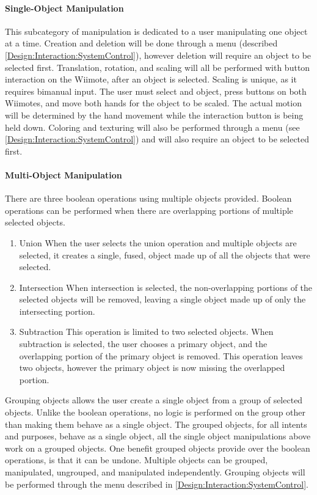 \paragraph{Single-Object Manipulation}
This subcategory of manipulation is dedicated to a user manipulating one object at a time.
Creation and deletion will be done through a menu (described \ref{Design:Interaction:SystemControl}), however deletion will require an object to be selected first.
Translation, rotation, and scaling will all be performed with button interaction on the Wiimote, after an object is selected.
Scaling is unique, as it requires bimanual input.
The user must select and object, press buttons on both Wiimotes, and move both hands for the object to be scaled.
The actual motion will be determined by the hand movement while the interaction button is being held down.
Coloring and texturing will also be performed through a menu (see \ref{Design:Interaction:SystemControl}) and will also require an object to be selected first.

\paragraph{Multi-Object Manipulation}
There are three boolean operations using multiple objects provided.  Boolean operations can be performed when there are overlapping portions of multiple selected objects.
\begin{enumerate}
	\item Union
	\subitem When the user selects the union operation and multiple objects are selected, it creates a single, fused, object made up of all the objects that were selected.
	\item Intersection
	\subitem When intersection is selected, the non-overlapping portions of the selected objects will be removed, leaving a single object made up of only the intersecting portion.
	\item Subtraction
	\subitem This operation is limited to two selected objects.  When subtraction is selected, the user chooses a primary object, and the overlapping portion of the primary object is removed.  This operation leaves two objects, however the primary object is now missing the overlapped portion.
\end{enumerate}

Grouping objects allows the user create a single object from a group of selected objects.
Unlike the boolean operations, no logic is performed on the group other than making them behave as a single object.
The grouped objects, for all intents and purposes, behave as a single object, all the single object manipulations above work on a grouped objects.
One benefit grouped objects provide over the boolean operations, is that it can be undone.
Multiple objects can be grouped, manipulated, ungrouped, and manipulated independently.
Grouping objects will be performed through the menu described in \ref{Design:Interaction:SystemControl}.

